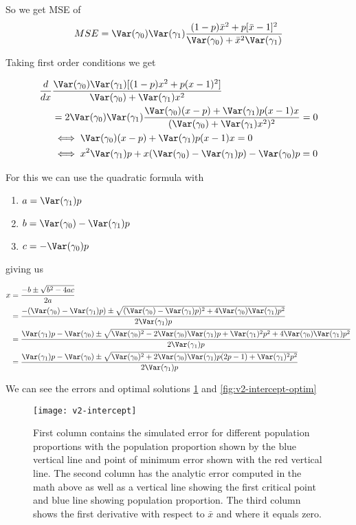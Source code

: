 So we get MSE of
\begin{align*}
	MSE &= \Var(\gamma_0) \Var(\gamma_1) \frac{(1-p) \bar{x}^2 + p[\bar{x} - 1]^2 }{\Var(\gamma_0) + \bar{x}^2 \Var(\gamma_1)}\\
\end{align*} 

Taking first order conditions we get

\begin{align*}
	\frac{d}{dx} &\frac{\Var(\gamma_0) \Var(\gamma_1) [ (1 - p) x^2 + p (x - 1)^2 ]}{\Var(\gamma_0) + \Var(\gamma_1) x^2} \\
&= 2 \Var(\gamma_0) \Var(\gamma_1) \frac{ \Var(\gamma_0) (x - p) + \Var(\gamma_1) p (x - 1) x }{(\Var(\gamma_0) + \Var(\gamma_1) x^2)^2} = 0 \\
&\iff \Var(\gamma_0) (x - p) + \Var(\gamma_1) p (x - 1) x = 0 \\
&\iff x^2 \Var(\gamma_1) p + x(\Var(\gamma_0) - \Var(\gamma_1) p) - \Var(\gamma_0) p = 0
\end{align*} 

For this we can use the quadratic formula with
\begin{enumerate}
	\item $a = \Var(\gamma_1) p$
	\item $b = \Var(\gamma_0) - \Var(\gamma_1) p$
	\item $c = - \Var(\gamma_0) p$
\end{enumerate}

giving us

\begin{align*}
	x &= \frac{-b \pm \sqrt{b^2 - 4ac}}{2a} \\
	  &= \frac{-(\Var(\gamma_0) - \Var(\gamma_1) p) \pm \sqrt{(\Var(\gamma_0) - \Var(\gamma_1) p)^2 + 4 \Var(\gamma_0) \Var(\gamma_1) p^2 }}{2 \Var(\gamma_1) p} \\
	  &= \frac{\Var(\gamma_1) p-\Var(\gamma_0)  \pm \sqrt{\Var(\gamma_0)^2 - 2\Var(\gamma_0) \Var(\gamma_1) p + \Var(\gamma_1)^2 p^2 + 4 \Var(\gamma_0) \Var(\gamma_1) p^2 }}{2 \Var(\gamma_1) p} \\
	  &= \frac{\Var(\gamma_1) p-\Var(\gamma_0)  \pm \sqrt{\Var(\gamma_0)^2 + 2\Var(\gamma_0) \Var(\gamma_1) p(2p -1) + \Var(\gamma_1)^2 p^2}}{2 \Var(\gamma_1) p} \\
\end{align*} 

We can see the errors and optimal solutions \ref{fig:v2-intercept} and \ref{fig:v2-intercept-optim}


\begin{figure}[ht!]
\label{fig:v2-intercept}
  \centering
	\texttt{[image: v2-intercept]}
	\caption{First column contains the simulated error for different population proportions with the population proportion shown by the blue vertical line and point of minimum error shown with the red vertical line. The second column has the analytic error computed in the math above as well as a vertical line showing the first critical point and blue line showing population proportion. The third column shows the first derivative with respect to $\bar{x}$ and where it equals zero.} 
\end{figure}


